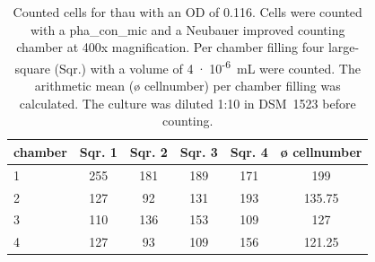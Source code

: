 \begin{table}[ht]
\centering
\caption[Counted cells for \acrlong{thau} with an \acrshort{OD} of 0.116.]{Counted cells for \acrlong{thau} with an \acrshort{OD} of 0.116. Cells were counted with a \gls{pha_con_mic} and a Neubauer improved counting chamber at 400x magnification. Per chamber filling four large-square (Sqr.) with a volume of 4~$\cdot$~10\textsuperscript{-6}~mL were counted. The arithmetic mean (ø cellnumber) per chamber filling was calculated. The culture was diluted 1:10 in DSM~1523 before counting.} 
\label{tab:cellnmr_tha_Y}
\begin{tabular}{lccccc}
  \toprule
chamber & Sqr. 1 & Sqr. 2 & Sqr. 3 & Sqr. 4 & ø cellnumber \\ 
  \midrule
1 & 255 & 181 & 189 & 171 & 199 \\ 
  2 & 127 &  92 & 131 & 193 & 135.75 \\ 
  3 & 110 & 136 & 153 & 109 & 127 \\ 
  4 & 127 &  93 & 109 & 156 & 121.25 \\ 
   \bottomrule
\end{tabular}
\end{table}
